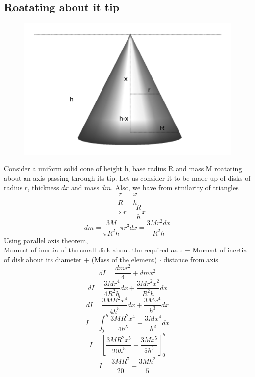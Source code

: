 \documentclass{article}
\begin{document}
\subsection{Roatating about it tip}
\begin{figure}[h!]
  \centering
  \includegraphics[scale=0.3]{cone2.png}
\end{figure}
Consider a uniform solid cone of height h, base radius R and mass M roatating about an axis passing through its tip. Let us consider it to be made up of disks of radius $r$, thickness $dx$ and mass $dm$. Also, we have from similarity of triangles
$$\frac{r}{R} = \frac{x}{h}$$
$$\implies r = \frac{R}{h}x$$
$$dm = \frac{3M}{\pi R^2h}\pi r^2 dx = \frac{3Mr^2dx}{R^2h}$$
Using parallel axis theorem,\\
Moment of inertia of the small disk about the required axis = Moment of inertia of disk about its diameter + (Mass of the element) $\cdot$ distance from axis
$$dI = \frac{dmr^2}{4} + dmx^2$$
$$dI = \frac{3Mr^4}{4R^2h}dx + \frac{3Mr^2x^2}{R^2h}dx$$
$$dI = \frac{3MR^2x^4}{4h^5}dx + \frac{3Mx^4}{h^3}dx$$
$$I = \int_0^h \frac{3MR^2x^4}{4h^5} + \frac{3Mx^4}{h^3} dx$$
$$I = \left[ \frac{3MR^2x^5}{20h^5} + \frac{3Mx^5}{5h^3} \right]_0^h$$
$$\boxed{I = \frac{3MR^2}{20} + \frac{3Mh^2}{5}}$$
\end{document}
